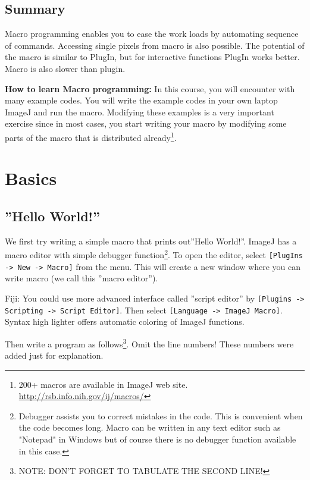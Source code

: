 \documentclass[11pt,a4paper,oneside]{report}
\newenvironment{indentFiji}%
{\begin{list}{}%
         {\setlength{\leftmargin}{1em}}%
         \item[]%
}
{\end{list}}
\newcommand{\ijmenu}[1]{\texttt{\small#1}}
\begin{document}
\subsection{Summary}
Macro programming enables you to ease the work loads by automating sequence of commands. Accessing single pixels from macro is also possible. The potential of the macro is similar to PlugIn, but for interactive functions PlugIn works better. Macro is also slower than plugin. 

\textbf{How to learn Macro programming:} In this course, you will encounter with many example codes. You will write the example codes in your own laptop ImageJ and run the macro. Modifying these examples is a very important exercise since in most cases, you start writing your macro by modifying some parts of the macro that is distributed already\footnote{200+ macros are available in ImageJ web site. \href{http://rsb.info.nih.gov/ij/macros/}{http://rsb.info.nih.gov/ij/macros/}}. 
\newpage
\section{Basics}

\subsection{''Hello World!''}

We first try writing a simple macro that prints out''Hello World!''. ImageJ has a macro editor with simple debugger function\footnote{Debugger assists you to correct mistakes in the code. This is convenient when the code becomes long. Macro can be written in any text editor such as "Notepad" in Windows but of course there is no debugger function available in this case.}. To open the editor, select \ijmenu{[PlugIns -> New -> Macro]} from the menu.  This will create a new window where you can write macro (we call this ''macro editor''). 
\begin{indentFiji}
Fiji: You could use more advanced interface called ''script editor'' by \ijmenu{[Plugins -> Scripting -> Script Editor]}. Then select \ijmenu{[Language -> ImageJ Macro]}. Syntax high lighter offers automatic coloring of ImageJ functions. 
\end{indentFiji}
Then write a program as follows\footnote{NOTE: DON'T FORGET TO TABULATE THE SECOND LINE!}. Omit the line numbers! These numbers were added just for explanation. 


%
\end{document}

